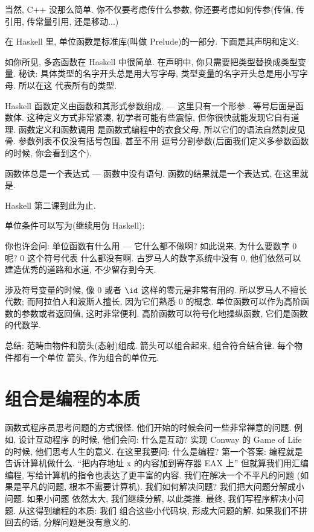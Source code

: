 当然, C++ 没那么简单. 你不仅要考虑传什么参数, 你还要考虑如何传参(传值, 传引用, 传常量引用, 还是移动...)

在 Haskell 里, 单位函数是标准库(叫做 Prelude)的一部分. 下面是其声明和定义:


如你所见, 多态函数在 Haskell 中很简单. 在声明中, 你只需要把类型替换成类型变量. 秘诀:
具体类型的名字开头总是用大写字母, 类型变量的名字开头总是用小写字母. 所以在这 
代表所有的类型.

Haskell 函数定义由函数和其形式参数组成, --- 这里只有一个形参 . 等号后面是函数体.
这种定义方式非常紧凑, 初学者可能有些震惊, 但你很快就能发现它自有道理. 函数定义和函数调用
是函数式编程中的衣食父母, 所以它们的语法自然剥皮见骨. 参数列表不仅没有括号包围, 甚至不用
逗号分割参数(后面我们定义多参数函数的时候, 你会看到这个).

函数体总是一个表达式 --- 函数中没有语句. 函数的结果就是一个表达式, 在这里就是.

Haskell 第二课到此为止.

单位条件可以写为(继续用伪 Haskell):

你也许会问: 单位函数有什么用 --- 它什么都不做啊? 如此说来, 为什么要数字 0 呢? 0 这个符号代表
什么都没有啊. 古罗马人的数字系统中没有 0, 他们依然可以建造优秀的道路和水道, 不少留存到今天.

涉及符号变量的时候, 像 0 或者 $\id$ 这样的零元是非常有用的. 所以罗马人不擅长代数;
而阿拉伯人和波斯人擅长, 因为它们熟悉 0 的概念. 单位函数可以作为高阶函数的参数或者返回值,
这时非常便利. 高阶函数可以符号化地操纵函数, 它们是函数的代数学.

总结: 范畴由物件和箭头(态射)组成. 箭头可以组合起来, 组合符合结合律. 每个物件都有一个单位
箭头, 作为组合的单位元.

\section{组合是编程的本质}

函数式程序员思考问题的方式很怪. 他们开始的时候会问一些非常禅意的问题. 例如, 设计互动程序
的时候, 他们会问: 什么是互动? 实现 Conway 的 Game of Life 的时候, 他们思考人生的意义.
在这里我要问: 什么是编程? 第一个答案: 编程就是告诉计算机做什么. ``把内存地址 x 的内容加到寄存器 EAX 上''
但就算我们用汇编编程, 写给计算机的指令也表达了更丰富的内容. 我们在解决一个不平凡的问题
(如果是平凡的问题, 根本不需要计算机). 我们如何解决问题? 我们把大问题分解成小问题. 如果小问题
依然太大, 我们继续分解, 以此类推. 最终, 我们写程序解决小问题. 从这得到编程的本质: 我们
组合这些小代码块, 形成大问题的解. 如果我们不拼回去的话, 分解问题是没有意义的.


